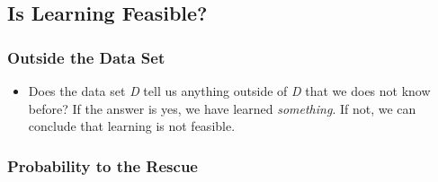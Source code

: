 \subsection{Is Learning Feasible?}
\subsubsection{Outside the Data Set}
\begin{itemize}[noitemsep, topsep=0pt]
    \item Does the data set \textit{D} tell us anything outside of \textit{D} that we does not know before? If the answer is yes, we have learned \textit{something}. If not, we can conclude that learning is not feasible.
\end{itemize}

\subsubsection{Probability to the Rescue}
